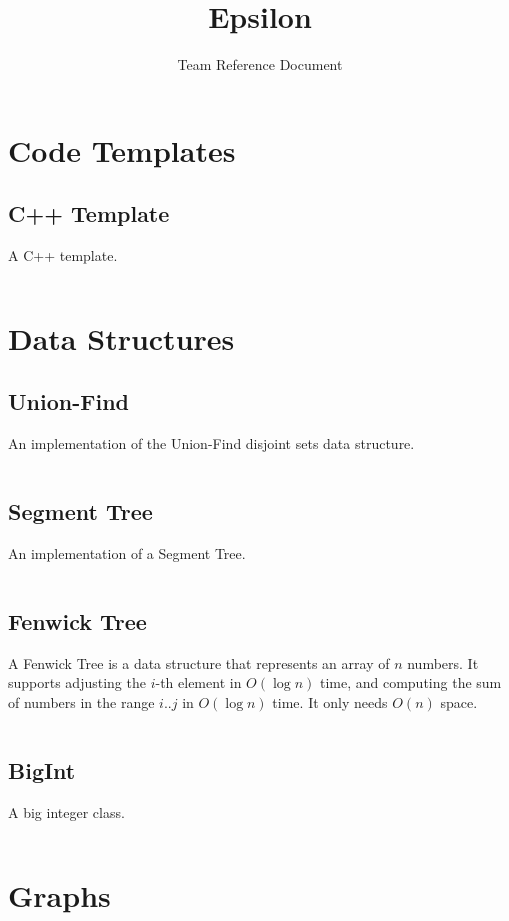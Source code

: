 \documentclass[9pt,a4paper,twocolumn,landscape,oneside]{amsart}
\title{Epsilon}
\subtitle{Team Reference Document}
\date{\ddmmyyyydate{\today{}}}
\newcommand{\code}[1]{\inputminted{cpp}{_Code/#1}}
\begin{document}
\maketitle
\thispagestyle{fancy}
\tableofcontents

\newpage

\section{Code Templates}
    \subsection{C++ Template}
        A C++ template.
        \code{template.cpp}

\section{Data Structures}
    \subsection{Union-Find}
        An implementation of the Union-Find disjoint sets data structure.
        \code{DataStructures/union_find.cpp}

    \subsection{Segment Tree}
        An implementation of a Segment Tree.
        \code{DataStructures/segment_tree.cpp}

    \subsection{Fenwick Tree}
        A Fenwick Tree is a data structure that represents an array of $n$
        numbers. It supports adjusting the $i$-th element in $O(\log n)$ time,
        and computing the sum of numbers in the range $i..j$ in $O(\log n)$
        time. It only needs $O(n)$ space.
        \code{DataStructures/fenwick_tree.cpp}

    \subsection{BigInt}
        A big integer class.
        \code{DataStructures/big_int.cpp}

\section{Graphs}
\end{document}
